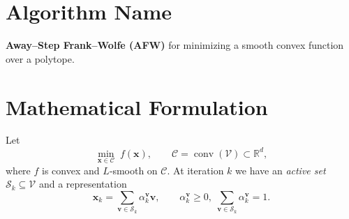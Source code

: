 \documentclass{article}
\newcommand{\conv}{\operatorname*{conv}}
\newcommand{\R}{\mathbb{R}}
\begin{document}
\section*{Algorithm Name}
\textbf{Away–Step Frank–Wolfe (AFW)} for minimizing a smooth convex function over a polytope.

\section*{Mathematical Formulation}
Let 
\[
\min_{\bm{x}\in \mathcal{C}} \; f(\bm{x}),
\qquad 
\mathcal{C}= \conv(\mathcal{V})\subset\R^{d},
\]
where $f$ is convex and $L$‑smooth on $\mathcal{C}$.  
At iteration $k$ we have an \emph{active set} $\mathcal{S}_{k}\subseteq\mathcal{V}$ and a representation
\[
\bm{x}_{k}= \sum_{\bm{v}\in\mathcal{S}_{k}} \alpha_{k}^{\bm{v}} \bm{v},
\qquad 
\alpha_{k}^{\bm{v}}\ge 0,\;\sum_{\bm{v}\in\mathcal{S}_{k}}\alpha_{k}^{\bm{v}}=1 .
\]
\end{document}

